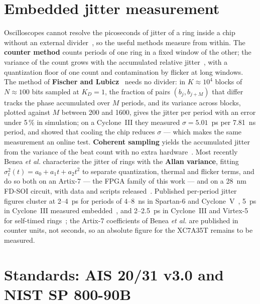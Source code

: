 \section{Embedded jitter measurement}
\label{sec:soa_jitter}

Oscilloscopes cannot resolve the picoseconds of jitter of a ring inside a
chip without an external divider~\cite{benea_2024_flicker}, so the useful
methods measure from within. The \textbf{counter method} counts periods of
one ring in a fixed window of the other; the variance of the count grows
with the accumulated relative jitter~\cite{killmann_2008_design,
lubicz_2015_towards}, with a quantization floor of one count and
contamination by flicker at long windows. The method of \textbf{Fischer
and Lubicz}~\cite{fischer_2014_embedded} needs no divider: in $K\approx10^4$
blocks of $N\approx100$ bits sampled at $K_D=1$, the fraction of pairs
$(b_j,b_{j+M})$ that differ tracks the phase accumulated over $M$ periods,
and its variance across blocks, plotted against $M$ between 200 and 1600,
gives the jitter per period with an error under 5\,\% in simulation; on a
Cyclone~III they measured $\sigma=5.01$~ps per 7.81~ns period, and showed
that cooling the chip reduces $\sigma$ --- which makes the same measurement
an online test. \textbf{Coherent sampling} yields the accumulated jitter
from the variance of the beat count with no extra
hardware~\cite{peetermans_2021_configurable}. Most recently Benea
\emph{et al.} characterize the jitter of rings with the \textbf{Allan
variance}, fitting $\sigma_t^2(t)=a_0+a_1 t+a_2 t^2$ to separate
quantization, thermal and flicker terms, and do so both on an Artix-7
--- the FPGA family of this work --- and on a 28~nm FD-SOI circuit, with
data and scripts released~\cite{benea_2024_flicker}. Published per-period
jitter figures cluster at 2--4~ps for periods of 4--8~ns in Spartan-6 and
Cyclone~V~\cite{petura_2016_survey}, 5~ps in Cyclone~III measured
embedded~\cite{fischer_2014_embedded}, and 2--2.5~ps in Cyclone~III and
Virtex-5 for self-timed rings~\cite{cherkaoui_2013_very}; the Artix-7
coefficients of Benea \emph{et al.} are published in counter units, not
seconds, so an absolute figure for the XC7A35T remains to be measured.

\section{Standards: AIS 20/31 v3.0 and NIST SP 800-90B}
\label{sec:soa_standards}


